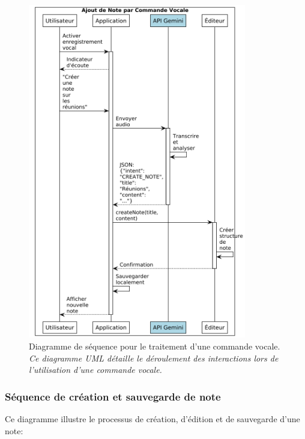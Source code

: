         \begin{figure}[htbp]
        \centering
        \includegraphics[width=0.85\textwidth]{assets/docs/voicenotion_sequence_voice.png}
        \caption{Diagramme de séquence pour le traitement d'une commande vocale. \newline\textit{Ce diagramme UML détaille le déroulement des interactions lors de l'utilisation d'une commande vocale.}}
        \label{fig:sequence_voice_command}
    \end{figure}
    
    \subsubsection{Séquence de création et sauvegarde de note}
    
    Ce diagramme illustre le processus de création, d'édition et de sauvegarde d'une note:
    
